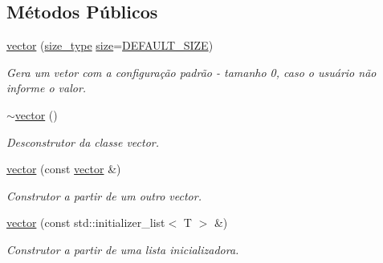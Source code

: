 \subsection*{Métodos Públicos}
\begin{DoxyCompactItemize}
\item 
\mbox{\label{classsc_1_1vector_af4bf98f36a9e6587c457771ca850a78f}} 
\hyperlink{classsc_1_1vector_af4bf98f36a9e6587c457771ca850a78f}{vector} (\hyperlink{classsc_1_1vector_a48bf37ba1a6d0c13504414d86e27c399}{size\+\_\+type} \hyperlink{classsc_1_1vector_afee521145d4c91a523a4ab3c605296a2}{size}=\hyperlink{classsc_1_1vector_a287b97d30cd9f7540da7d5ef628e49a7}{D\+E\+F\+A\+U\+L\+T\+\_\+\+S\+I\+ZE})
\begin{DoxyCompactList}\small\item\em Gera um vetor com a configuração padrão -\/ tamanho 0, caso o usuário não informe o valor. \end{DoxyCompactList}\item 
\mbox{\label{classsc_1_1vector_a024d736c8ec23f0bc187a4a0e59b2da5}} 
\hyperlink{classsc_1_1vector_a024d736c8ec23f0bc187a4a0e59b2da5}{$\sim$vector} ()
\begin{DoxyCompactList}\small\item\em Desconstrutor da classe vector. \end{DoxyCompactList}\item 
\mbox{\label{classsc_1_1vector_ac138a82e58bbe44d65197b820637003b}} 
\hyperlink{classsc_1_1vector_ac138a82e58bbe44d65197b820637003b}{vector} (const \hyperlink{classsc_1_1vector}{vector} \&)
\begin{DoxyCompactList}\small\item\em Construtor a partir de um outro vector. \end{DoxyCompactList}\item 
\mbox{\label{classsc_1_1vector_a18854e08d7337a72092ff5f41ddf666f}} 
\hyperlink{classsc_1_1vector_a18854e08d7337a72092ff5f41ddf666f}{vector} (const std\+::initializer\+\_\+list$<$ T $>$ \&)
\begin{DoxyCompactList}\small\item\em Construtor a partir de uma lista inicializadora. \end{DoxyCompactList}\item 

\end{DoxyCompactItemize}
